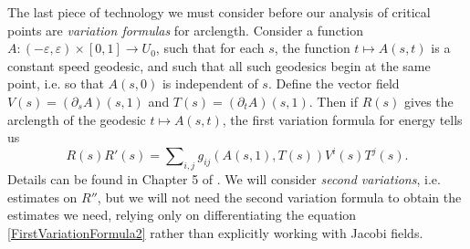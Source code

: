 %
%
%
%
%

The last piece of technology we must consider before our analysis of critical points are \emph{variation formulas} for arclength. Consider a function $A: (-\varepsilon,\varepsilon) \times [0,1] \to U_0$, such that for each $s$, the function $t \mapsto A(s,t)$ is a constant speed geodesic, and such that all such geodesics begin at the same point, i.e. so that $A(s,0)$ is independent of $s$. Define the vector field $V(s) = (\partial_s A)(s,1)$ and $T(s) = (\partial_t A)(s,1)$. Then if $R(s)$ gives the arclength of the geodesic $t \mapsto A(s,t)$, the first variation formula for energy tells us
%
\begin{equation} \label{FirstVariationFormula2}
    R(s) R'(s) = \sum\nolimits_{i,j} g_{ij}( A(s,1), T(s) ) V^i(s) T^j(s).
\end{equation}
%
Details can be found in Chapter 5 of \cite{BaoChern}. We will consider \emph{second variations}, i.e. estimates on $R''$, but we will not need the second variation formula to obtain the estimates we need, relying only on differentiating the equation \eqref{FirstVariationFormula2} rather than explicitly working with Jacobi fields. %
%

